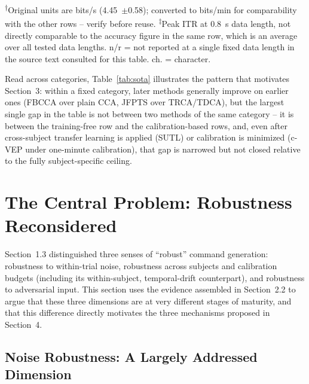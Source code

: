 \documentclass[11pt]{article}
\begin{document}
\begin{table}[htbp]
\vspace{0.15cm}
\raggedright
\footnotesize
\textsuperscript{$\dagger$}Original units are bits/s (4.45~$\pm$0.58); converted to bits/min for comparability with the other rows -- verify before reuse. \quad
\textsuperscript{$\ddagger$}Peak ITR at 0.8~s data length, not directly comparable to the accuracy figure in the same row, which is an average over all tested data lengths. \quad
n/r = not reported at a single fixed data length in the source text consulted for this table. \quad ch. = character.
\end{table}

Read across categories, Table~\ref{tab:sota} illustrates the pattern that motivates Section~3: within a fixed category, later methods generally improve on earlier ones (FBCCA over plain CCA, JFPTS over TRCA/TDCA), but the largest single gap in the table is not between two methods of the same category -- it is between the training-free row and the calibration-based rows, and, even after cross-subject transfer learning is applied (SUTL) or calibration is minimized (c-VEP under one-minute calibration), that gap is narrowed but not closed relative to the fully subject-specific ceiling.


\section{The Central Problem: Robustness Reconsidered}

Section~1.3 distinguished three senses of ``robust'' command generation: robustness to within-trial noise, robustness across subjects and calibration budgets (including its within-subject, temporal-drift counterpart), and robustness to adversarial input. This section uses the evidence assembled in Section~2.2 to argue that these three dimensions are at very different stages of maturity, and that this difference directly motivates the three mechanisms proposed in Section~4.

\subsection{Noise Robustness: A Largely Addressed Dimension}
\end{document}
